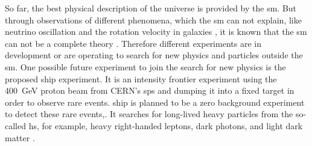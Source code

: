 So far, the best physical description of the universe is provided by the \ac{sm}.
But through observations of different phenomena, which the \ac{sm} can not explain, like neutrino oscillation \cite{} and the rotation velocity in galaxies \cite{}, it is known that the \ac{sm} can not be a complete theory \cite{}.
Therefore different experiments are in development or are operating to search for new physics and particles outside the \ac{sm}.
One possible future experiment to join the search for new physics is the proposed \ac{ship} experiment.
It is an intensity frontier experiment using the \SI{400}{\giga\electronvolt} proton beam from CERN's \ac{sps} and dumping it into a fixed target in order to observe rare events.
\ac{ship} is planned to be a zero background experiment to detect these rare events,.
It searches for long-lived heavy particles from the so-called \ac{hs}, for example, heavy right-handed leptons, dark photons, and light dark matter \cite{}.

